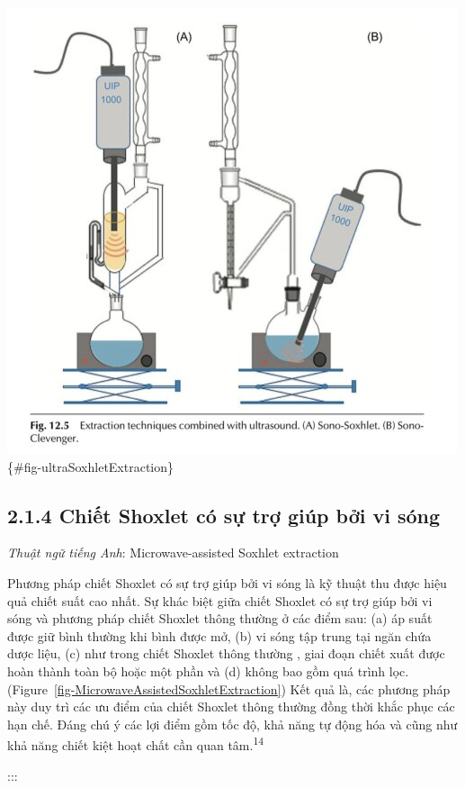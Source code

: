 \documentclass[
  twocolumn,
  landscape]{report}
\begin{document}
\includegraphics{../graphics/ultrasonic-soxhlet-extraction.png}
\{\#fig-ultraSoxhletExtraction\}

\subsection{2.1.4 Chiết Shoxlet có sự trợ giúp bởi vi
sóng}\label{chiux1ebft-shoxlet-cuxf3-sux1ef1-trux1ee3-giuxfap-bux1edfi-vi-suxf3ng}

\emph{Thuật ngữ tiếng Anh}: Microwave-assisted Soxhlet extraction

Phương pháp chiết Shoxlet có sự trợ giúp bởi vi sóng là kỹ thuật thu
được hiệu quả chiết suất cao nhất. Sự khác biệt giữa chiết Shoxlet có sự
trợ giúp bởi vi sóng và phương pháp chiết Shoxlet thông thường ở các
điểm sau: (a) áp suất được giữ bình thường khi bình được mở, (b) vi sóng
tập trung tại ngăn chứa dược liệu, (c) như trong chiết Shoxlet thông
thường , giai đoạn chiết xuất được hoàn thành toàn bộ hoặc một phần và
(d) không bao gồm quá trình lọc.
(Figure~\ref{fig-MicrowaveAssistedSoxhletExtraction}) Kết quả là, các
phương pháp này duy trì các ưu điểm của chiết Shoxlet thông thường đồng
thời khắc phục các hạn chế. Đáng chú ý các lợi điểm gồm tốc độ, khả năng
tự động hóa và cũng như khả năng chiết kiệt hoạt chất cần quan
tâm.\textsuperscript{14}

:::
\end{document}
